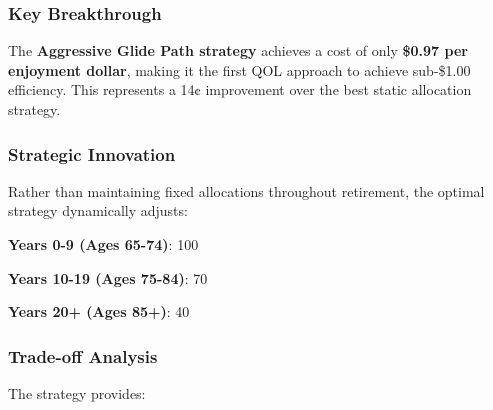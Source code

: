 \documentclass[11pt,letterpaper]{article}
\begin{document}
\subsubsection{Key Breakthrough}

The \textbf{Aggressive Glide Path strategy} achieves a cost of only \textbf{\$0.97 per enjoyment dollar}, making it the first QOL approach to achieve sub-\$1.00 efficiency. This represents a 14¢ improvement over the best static allocation strategy.


\subsubsection{Strategic Innovation}

Rather than maintaining fixed allocations throughout retirement, the optimal strategy dynamically adjusts:

\item \textbf{Years 0-9 (Ages 65-74)}: 100%
\item \textbf{Years 10-19 (Ages 75-84)}: 70%
\item \textbf{Years 20+ (Ages 85+)}: 40%

\subsubsection{Trade-off Analysis}

The strategy provides:
\end{document}
